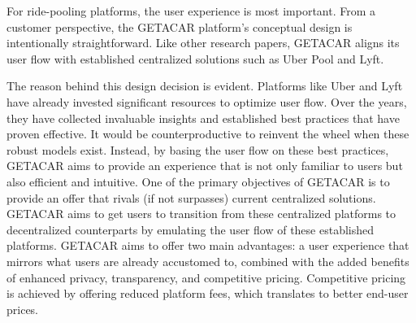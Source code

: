 For ride-pooling platforms, the user experience is most important. From a customer perspective, the GETACAR platform's conceptual design is intentionally straightforward. Like other research papers, GETACAR aligns its user flow with established centralized solutions such as Uber Pool and Lyft.

The reason behind this design decision is evident. Platforms like Uber and Lyft have already invested significant resources to optimize user flow. Over the years, they have collected invaluable insights and established best practices that have proven effective. It would be counterproductive to reinvent the wheel when these robust models exist. Instead, by basing the user flow on these best practices, GETACAR aims to provide an experience that is not only familiar to users but also efficient and intuitive. 
One of the primary objectives of GETACAR is to provide an offer that rivals (if not surpasses) current centralized solutions. GETACAR aims to get users to transition from these centralized platforms to decentralized counterparts by emulating the user flow of these established platforms. GETACAR aims to offer two main advantages: a user experience that mirrors what users are already accustomed to, combined with the added benefits of enhanced privacy, transparency, and competitive pricing. Competitive pricing is achieved by offering reduced platform fees, which translates to better end-user prices. 

